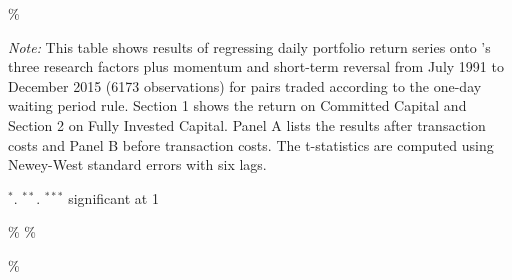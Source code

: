 \documentclass[a4paper]{article}
\begin{document}
\begin{sidewaystable}
\begin{threeparttable}[H]
\begin{tabularx}{\textwidth}{@{\extracolsep{\fill}}lllllllllllllll@{}}
			\bottomrule
		\end{tabularx}\%
		\begin{tablenotes}
			\item \textit{Note:} \scriptsize  This table shows results of regressing daily portfolio return series onto \citet*{ff93}'s three research factors plus momentum and short-term reversal from July 1991 to December 2015 (6173 observations) for pairs traded according to the one-day waiting period rule. Section 1 shows the return on Committed Capital and Section 2 on Fully Invested Capital. Panel A lists the results after transaction costs and Panel B before transaction costs. The t-statistics are computed using Newey-West standard errors with six lags.
			\item \scriptsize $^{\ast}$. $^{\ast\ast}$. $^{\ast\ast\ast}$  significant at 1\\%
		\end{tablenotes}
	\end{threeparttable}\%
	\label{tab:table114}\%
\end{sidewaystable}\%
\end{document}
